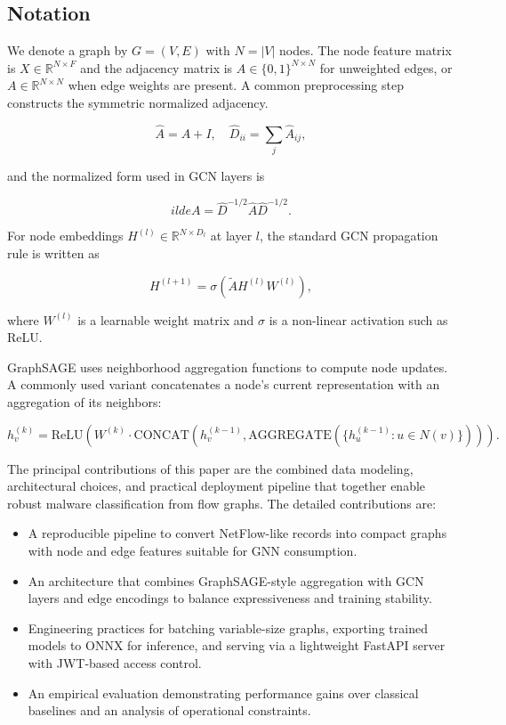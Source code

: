 \documentclass[conference]{IEEEtran}
\begin{document}
\subsection{Notation}

We denote a graph by $G = (V, E)$ with $N = |V|$ nodes. The node feature matrix is $X \in \mathbb{R}^{N \times F}$ and the adjacency matrix is $A \in \{0,1\}^{N \times N}$ for unweighted edges, or $A \in \mathbb{R}^{N \times N}$ when edge weights are present. A common preprocessing step constructs the symmetric normalized adjacency.

\begin{equation}
\hat{A} = A + I, \quad \hat{D}_{ii} = \sum_j \hat{A}_{ij},
\end{equation}

and the normalized form used in GCN layers is

\begin{equation}
	ilde{A} = \hat{D}^{-1/2} \hat{A} \hat{D}^{-1/2}.
\end{equation}

For node embeddings $H^{(l)} \in \mathbb{R}^{N \times D_l}$ at layer $l$, the standard GCN propagation rule is written as

\begin{equation}
H^{(l+1)} = \sigma\left( \tilde{A} H^{(l)} W^{(l)} \right),
\end{equation}

where $W^{(l)}$ is a learnable weight matrix and $\sigma$ is a non-linear activation such as ReLU.

GraphSAGE uses neighborhood aggregation functions  to compute node updates. A commonly used variant concatenates a node's current representation with an aggregation of its neighbors:

\begin{equation}
h_v^{(k)} = \text{ReLU}\left( W^{(k)} \cdot \text{CONCAT}\left(h_v^{(k-1)}, \text{AGGREGATE}\left( \{ h_u^{(k-1)} : u \in N(v) \} \right)\right) \right).
\end{equation}

The principal contributions of this paper are the combined data modeling, architectural choices, and practical deployment pipeline that together enable robust malware classification from flow graphs. The detailed contributions are:

\begin{itemize}
	\item A reproducible pipeline to convert NetFlow-like records into compact graphs with node and edge features suitable for GNN consumption.
	\item An architecture that combines GraphSAGE-style aggregation with GCN layers and edge encodings to balance expressiveness and training stability.
	\item Engineering practices for batching variable-size graphs, exporting trained models to ONNX for inference, and serving via a lightweight FastAPI server with JWT-based access control.
	\item An empirical evaluation demonstrating performance gains over classical baselines and an analysis of operational constraints.
\end{itemize}
\end{document}
